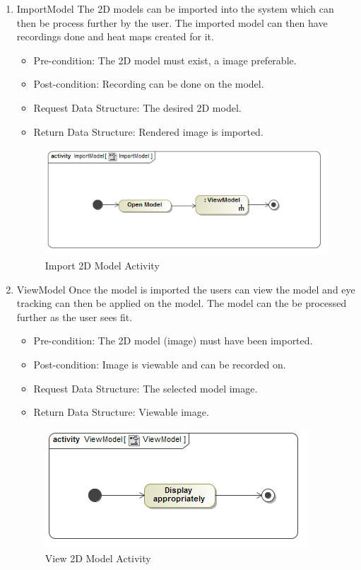 	\begin{enumerate}
		\item{ImportModel}
		\newline
		The 2D models can be imported into the system which can then be process further by the user. The imported model can then have recordings done and heat maps created for it. 
		\begin{itemize}
			\item Pre-condition: The 2D model must exist, a image preferable.
			\item Post-condition: Recording can be done on the model.
			\item Request Data Structure: The desired 2D model.
			\item Return Data Structure: Rendered image is imported.
		\end{itemize}
		
		\begin{figure}[!ht]
			\centering
			\includegraphics[scale=0.5]{Diagrams/Activity_Diagram__ImportModel__ImportModel.png}
			\caption{Import 2D Model Activity}
		\end{figure}
	
		\item{ViewModel}
		Once the model is imported the users can view the model and eye tracking can then be applied on the model. The model can the be processed further as the user sees fit.
		\begin{itemize}
			\item Pre-condition: The 2D model (image) must have been imported.
			\item Post-condition: Image is viewable and can be recorded on.
			\item Request Data Structure: The selected model image.
			\item Return Data Structure: Viewable image.
		\end{itemize}
		
		\begin{figure}[!ht]
			\centering
			\includegraphics[scale=0.5]{Diagrams/Activity_Diagram__ViewModel__ViewModel.png}
			\caption{View 2D Model Activity}
		\end{figure}
	

\end{enumerate}
